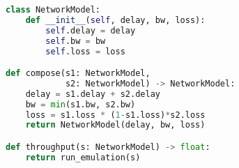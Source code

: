 \begin{lstfloat}[t]
\begin{lstlisting}[language=Python]
class NetworkModel:
    def __init__(self, delay, bw, loss):
        self.delay = delay
        self.bw = bw
        self.loss = loss

def compose(s1: NetworkModel,
            s2: NetworkModel) -> NetworkModel:
    delay = s1.delay + s2.delay
    bw = min(s1.bw, s2.bw)
    loss = s1.loss * (1-s1.loss)*s2.loss
    return NetworkModel(delay, bw, loss)

def throughput(s: NetworkModel) -> float:
    return run_emulation(s)
\end{lstlisting}
\label{lst:splitting:network-model}
\end{lstfloat}
